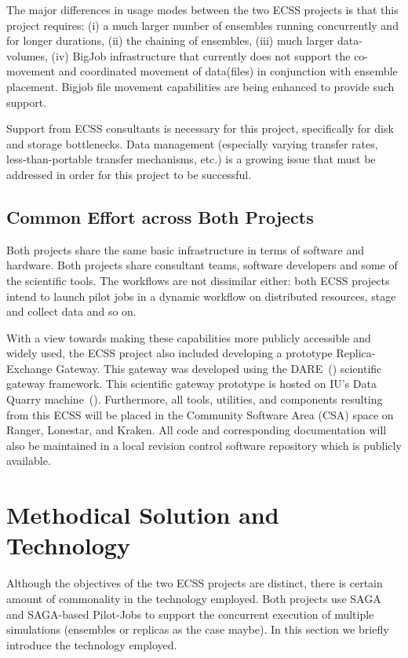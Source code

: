 \documentclass{sig-alternate}
\begin{document}
The major differences in usage modes between the two ECSS projects is that this
project requires: (i) a much larger number of ensembles running concurrently and
for longer durations, (ii) the chaining of ensembles, (iii) much larger
data-volumes, (iv)  BigJob infrastructure that currently does not support the
co-movement and coordinated movement of data(files) in conjunction with ensemble
placement. Bigjob file movement capabilities are being enhanced to provide
such support.

Support from ECSS consultants is necessary for this project, specifically for disk
and storage bottlenecks. Data management (especially varying transfer rates,
less-than-portable transfer mechanisms, etc.) is a growing issue that must be 
addressed in order for this project to be successful.

\subsection{Common Effort across Both Projects}

Both projects share the same basic infrastructure in terms of software and
hardware. Both projects share consultant teams, software developers and some of
the scientific tools. The workflows are not dissimilar either: both ECSS
projects intend to launch pilot jobs in a dynamic workflow on distributed
resources, stage and collect data and so on.

With a view towards making these capabilities more publicly accessible and
widely used, the ECSS project also included developing a prototype
Replica-Exchange Gateway. This gateway was developed using the
DARE~(\cite{DARE})
scientific gateway framework. This scientific gateway prototype is hosted
on IU's Data Quarry machine~(\cite{DataQuarry}). Furthermore, all tools,
utilities, and components resulting from this ECSS will be placed in the Community 
Software Area (CSA) space on Ranger,
Lonestar, and Kraken. All code and corresponding documentation will also be
maintained in a local revision control software repository which is publicly
available.


\section{Methodical Solution and Technology}

Although the objectives of the two ECSS projects are distinct, there
is certain amount of commonality in the technology employed. Both
projects use SAGA and SAGA-based Pilot-Jobs to support the concurrent
execution of multiple simulations (ensembles or replicas as the case
maybe). In this section we briefly introduce the technology employed.
\end{document}

